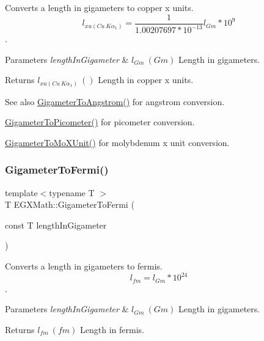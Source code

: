 Converts a length in gigameters to copper x units. \[ l_{xu(Cu\ K\alpha_1)}= \frac{1}{1.00207697*10^{-13}} l_{Gm} * 10^{9}\]. 


\begin{DoxyParams}{Parameters}
{\em length\+In\+Gigameter} & $ l_{Gm}\ (Gm)$ Length in gigameters. \\
\hline
\end{DoxyParams}
\begin{DoxyReturn}{Returns}
$ l_{xu(Cu\ K\alpha_1)}\ ()$ Length in copper x units. 
\end{DoxyReturn}
\begin{DoxySeeAlso}{See also}
\mbox{\hyperlink{group___e_g_x_math-_conversions-_length_conversions-_s_i-_gigameter-_non-_s_i_ga622e85e3f663039f3802b29d25655989}{Gigameter\+To\+Angstrom()}} for angstrom conversion. 

\mbox{\hyperlink{group___e_g_x_math-_conversions-_length_conversions-_s_i-_gigameter-_s_i_gae9cea35a0ce747d02ec8b6cf7bfeaa7e}{Gigameter\+To\+Picometer()}} for picometer conversion. 

\mbox{\hyperlink{group___e_g_x_math-_conversions-_length_conversions-_s_i-_gigameter-_non-_s_i_gac30ae06633de77b05d859ffb3cd2a577}{Gigameter\+To\+Mo\+X\+Unit()}} for molybdenum x unit conversion. 
\end{DoxySeeAlso}
\mbox{\label{group___e_g_x_math-_conversions-_length_conversions-_s_i-_gigameter-_non-_s_i_gadf6d730ad6e47bc8be214f3ef59b48ca}} 
\subsubsection{\texorpdfstring{Gigameter\+To\+Fermi()}{GigameterToFermi()}}
{\footnotesize\ttfamily template$<$typename T $>$ \\
T E\+G\+X\+Math\+::\+Gigameter\+To\+Fermi (\begin{DoxyParamCaption}\item[{const T}]{length\+In\+Gigameter }\end{DoxyParamCaption})}



Converts a length in gigameters to fermis. \[ l_{fm}=l_{Gm} * 10^{24} \]. 


\begin{DoxyParams}{Parameters}
{\em length\+In\+Gigameter} & $ l_{Gm}\ (Gm)$ Length in gigameters. \\
\hline
\end{DoxyParams}
\begin{DoxyReturn}{Returns}
$ l_{fm}\ (fm)$ Length in fermis. 
\end{DoxyReturn}
\mbox{\label{group___e_g_x_math-_conversions-_length_conversions-_s_i-_gigameter-_non-_s_i_ga90426d22455e96b1f61e1850c7b89f77}} 

